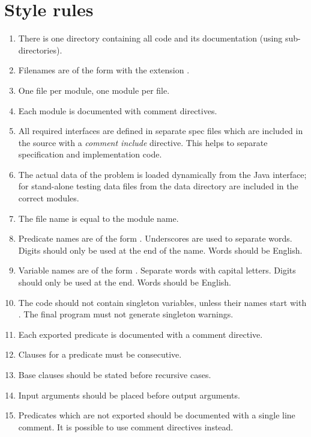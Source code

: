 \section{Style rules}
\begin{enumerate}
\item  There is one directory containing all code and its documentation (using
  sub-directories).
\item  Filenames are of the form \notation{[a-z][a-z_]+} with
  the extension .
\item  One file per module, one module per file.
\item  Each module is documented with comment directives.
\item  All required interfaces are defined in separate spec files which are
  included in the source with a \emph{comment include} directive. This helps to
  separate specification and implementation code.
\item  The actual data of the problem is loaded dynamically from the Java
  interface; for stand-alone testing data files from the data directory are
  included in the correct modules.
\item  The file name is equal to the module name.
\item  Predicate names are of the form
  \notation{[a-z][a-z_]*[0-9]*}. Underscores are used to separate words. Digits
  should only be used at the  end of the name. Words should be English.
\item  Variable names are of the form
  \notation{[A-Z_][a-zA-Z]*[0-9]*}. Separate words with capital letters. Digits
  should only be used at the end. Words should be English.
\item  The code should not contain singleton variables, unless
  their names start with \notation{_}. The final program must not generate
  singleton warnings.
\item  Each exported predicate is documented with a comment
  directive.
\item  Clauses for a predicate must be consecutive.
\item  Base clauses should be stated before recursive cases.
\item  Input arguments should be placed before output arguments.
\item  Predicates which are not exported should be documented with a single line
  comment. It is possible to use comment directives instead.

\end{enumerate}
